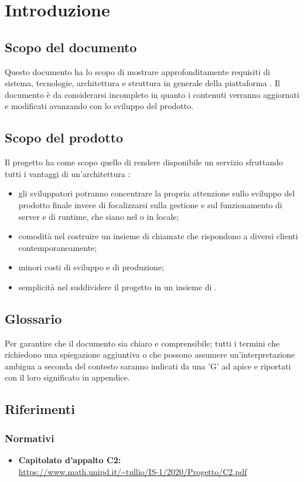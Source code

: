 \section{Introduzione}
\label{introduzione}
\subsection{Scopo del documento}
Questo documento ha lo scopo di mostrare approfonditamente requisiti di sistema, tecnologie, architettura e struttura in generale della piattaforma \NomeProgetto. Il documento è da considerarsi incompleto in quanto i contenuti verranno aggiornati e modificati avanzando con lo sviluppo del prodotto.
\subsection{Scopo del prodotto} 
Il progetto {\NomeProgetto} ha come scopo quello di rendere disponibile un servizio  sfruttando tutti i vantaggi di un'architettura :
\begin{itemize}
	\item gli sviluppatori potranno concentrare la propria attenzione sullo sviluppo del prodotto finale invece di focalizzarsi sulla gestione e sul funzionamento di server e di runtime, che siano nel  o in locale;
	\item comodità nel costruire un insieme di chiamate  che rispondono a diversi clienti contemporaneamente;
	\item minori costi di sviluppo e di produzione;
	\item semplicità nel suddividere il progetto in un insieme di .
\end{itemize}
\subsection{Glossario}
Per garantire che il documento sia chiaro e comprensibile; tutti i termini che richiedono una spiegazione aggiuntiva o che possono assumere un'interpretazione ambigua a seconda del contesto saranno indicati da una 'G' ad apice e riportati con il loro significato in appendice.
\subsection{Riferimenti}
\subsubsection{Normativi}
\begin{itemize}
	\item \textbf{Capitolato d'appalto C2:}\\
	\url{https://www.math.unipd.it/~tullio/IS-1/2020/Progetto/C2.pdf}
\end{itemize}
